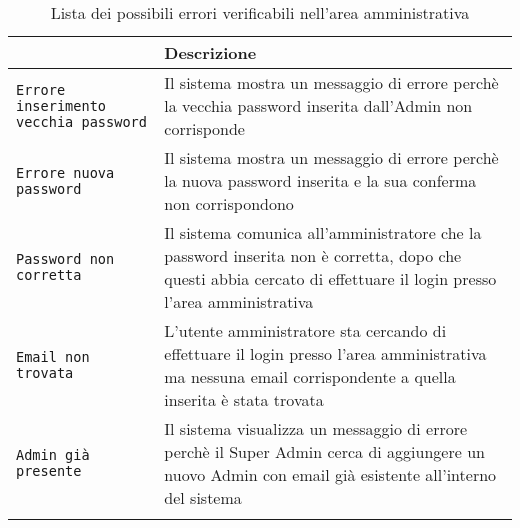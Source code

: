 \documentclass[../ManualeUtente_v1.0.0.tex]{subfiles}
\begin{document}

		 	\begin{longtable}[c] { >{\centering\arraybackslash}p{5cm} p{10cm} }
				\toprule
				{\textbf{Errore}} & {\textbf{Descrizione}} \\
				\midrule
				\texttt{Errore inserimento vecchia password} & Il sistema mostra un messaggio di errore perchè la vecchia password inserita dall’Admin non corrisponde \\
		 		\addlinespace[0.3em]
		 		\midrule
				\texttt{Errore nuova password} & Il sistema mostra un messaggio di errore perchè la nuova password inserita e la sua conferma non corrispondono \\
				\addlinespace[0.3em]
		 		\midrule
				\texttt{Password non corretta} & Il sistema comunica all’amministratore che la password inserita non è corretta, dopo che questi abbia cercato di effettuare il login presso l’area amministrativa \\
				\addlinespace[0.3em]
		 		\midrule
				\texttt{Email non trovata} & L’utente amministratore sta cercando di effettuare il login presso l’area amministrativa ma nessuna email corrispondente a quella inserita è stata trovata \\
				\addlinespace[0.3em]
		 		\midrule
				\texttt{Admin già presente} & Il sistema visualizza un messaggio di errore perchè il Super Admin cerca di aggiungere un nuovo Admin con email già esistente all'interno del sistema \\
		 		\addlinespace[0.3em]
				\bottomrule
				\caption{Lista dei possibili errori verificabili nell'area amministrativa}
			\end{longtable}
\end{document}
